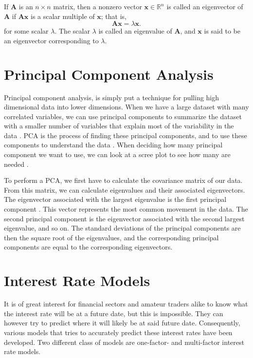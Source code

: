 \noindent If $\mathbf{A}$ is an $n \times n$ matrix, then a nonzero vector $\boldsymbol{x} \in \mathbb{R}^n$ is called an eigenvector of $\mathbf{A}$ if $\mathbf{A} \boldsymbol{x}$ is a scalar multiple of $\boldsymbol{x}$; that is, \begin{equation*}
    \mathbf{A} \boldsymbol{x} = \lambda \boldsymbol{x}.
\end{equation*} for some scalar $\lambda$. The scalar $\lambda$ is called an eigenvalue of $\mathbf{A}$, and $\boldsymbol{x}$ is said to be an eigenvector corresponding to $\lambda$. \cite[p.~291]{elementary_lin_alg}

\section{Principal Component Analysis}

\noindent Principal component analysis, is simply put a technique for pulling high dimensional data into lower dimensions. When we have a large dataset with many correlated variables, we can use principal components to summarize the dataset with a smaller number of variables that explain most of the variability in the data \cite[p.~498]{intro_stat_learning}. PCA is the process of finding these principal components, and to use these components to understand the data \cite[p.~499]{intro_stat_learning}. When deciding how many principal component we want to use, we can look at a scree plot to see how many are needed \cite[p.~509]{intro_stat_learning}.

To perform a PCA, we first have to calculate the covariance matrix of our data. From this matrix, we can calculate eigenvalues and their associated eigenvectors. The eigenvector associated with the largest eigenvalue is the first principal component \cite[p.~618]{WFI}. This vector represents the most common movement in the data. The second principal component is the eigenvector associated with the second largest eigenvalue, and so on. The standard deviations of the principal components are then the square root of the eigenvalues, and the corresponding principal components are equal to the corresponding eigenvectors.

\section{Interest Rate Models}

\noindent It is of great interest for financial sectors and amateur traders alike to know what the interest rate will be at a future date, but this is impossible. They can however try to predict where it will likely be at said future date. Consequently, various models that tries to accurately predict these interest rates have been developed. Two different class of models are one-factor- and multi-factor interest rate models. \cite[p.~507--624]{WFI}

